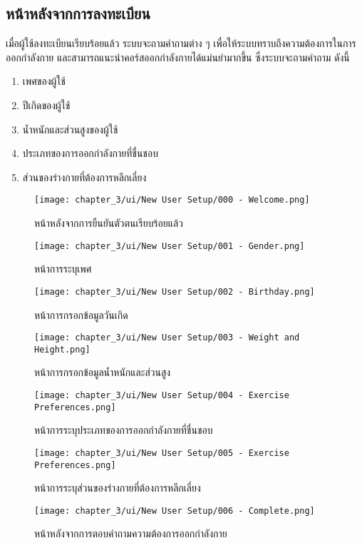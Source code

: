 \subsection{หน้าหลังจากการลงทะเบียน}
เมื่อผู้ใช้ลงทะเบียนเรียบร้อยแล้ว ระบบจะถามคำถามต่าง ๆ เพื่อให้ระบบทราบถึงความต้องการในการออกกำลังกาย และสามารถแนะนำคอร์สออกกำลังกายได้แม่นยำมากขึ้น ซึ่งระบบจะถามคำถาม ดังนี้
\begin{enumerate}
    \item เพศของผู้ใช้
    \item ปีเกิดของผู้ใช้
    \item น้ำหนักและส่วนสูงของผู้ใช้
    \item ประเภทของการออกกำลังกายที่ชื่นชอบ
    \item ส่วนของร่างกายที่ต้องการหลีกเลี่ยง
\end{enumerate}

\begin{figure}
    \texttt{[image: chapter\_3/ui/New User Setup/000 - Welcome.png]}
    \caption{หน้าหลังจากการยืนยันตัวตนเรียบร้อยแล้ว}
\end{figure}
\begin{figure}
    \texttt{[image: chapter\_3/ui/New User Setup/001 - Gender.png]}
    \caption{หน้าการระบุเพศ}
\end{figure}
\begin{figure}
    \texttt{[image: chapter\_3/ui/New User Setup/002 - Birthday.png]}
    \caption{หน้าการกรอกข้อมูลวันเกิด}
\end{figure}
\begin{figure}
    \texttt{[image: chapter\_3/ui/New User Setup/003 - Weight and Height.png]}
    \caption{หน้าการกรอกข้อมูลน้ำหนักและส่วนสูง}
\end{figure}
\begin{figure}
    \texttt{[image: chapter\_3/ui/New User Setup/004 - Exercise Preferences.png]}
    \caption{หน้าการระบุประเภทของการออกกำลังกายที่ชื่นชอบ}
\end{figure}
\begin{figure}
    \texttt{[image: chapter\_3/ui/New User Setup/005 - Exercise Preferences.png]}
    \caption{หน้าการระบุส่วนของร่างกายที่ต้องการหลีกเลี่ยง}
\end{figure}
\begin{figure}
    \texttt{[image: chapter\_3/ui/New User Setup/006 - Complete.png]}
    \caption{หน้าหลังจากการตอบคำถามความต้องการออกกำลังกาย}
\end{figure}

